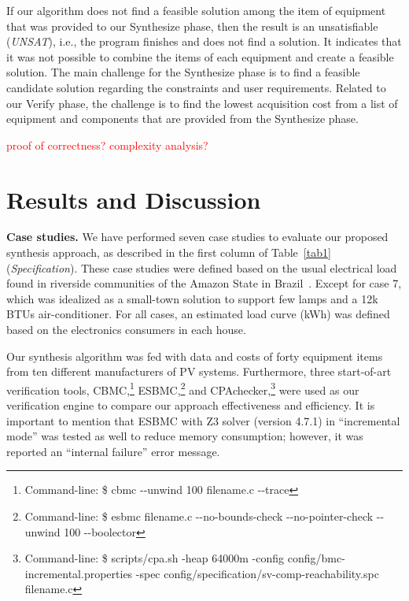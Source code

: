 \documentclass[runningheads]{llncs}
\begin{document}
If our algorithm does not find a feasible solution among the item of equipment that was provided to our {\sc Synthesize} phase, then the result is an unsatisfiable (\textit{UNSAT}), i.e., the program finishes and does not find a solution. It indicates that it was not possible to combine the items of each equipment and create a feasible solution. The main challenge for the {\sc Synthesize} phase is to find a feasible candidate solution regarding the constraints and user requirements. Related to our {\sc Verify} phase, the challenge is to find the lowest acquisition cost from a list of equipment and components that are provided from the {\sc Synthesize} phase. 

\textcolor{red}{proof of correctness? complexity analysis?}

\section{Results and Discussion}

\textbf{Case studies.} We have performed seven case studies to evaluate our proposed synthesis approach, as described in the first column of Table~\ref{tab1} 
(\textit{Specification}). These case studies were defined based on the usual electrical load found in riverside communities of the Amazon State in Brazil~\cite{Agrener2013,TrindadeCordeiro19}. Except for case 7, which was idealized as a small-town solution to support few lamps and a 12k BTUs air-conditioner. For all cases, an estimated load curve (kWh) was defined based on the electronics consumers in each house.

Our synthesis algorithm was fed with data and costs of forty equipment items from ten different manufacturers of PV systems. Furthermore, three start-of-art verification tools, CBMC,\footnote{Command-line: \$ cbmc -\phantom{}-unwind 100 filename.c -\phantom{}-trace} ESBMC,\footnote{Command-line: \$ esbmc filename.c -\phantom{}-no-bounds-check -\phantom{}-no-pointer-check -\phantom{}-unwind 100 -\phantom{}-boolector} and CPAchecker,\footnote{Command-line: \$ scripts/cpa.sh -heap 64000m -config config/bmc-incremental.properties -spec config/specification/sv-comp-reachability.spc filename.c} were used as our verification engine to compare our approach effectiveness and efficiency. It is important to mention that ESBMC with Z3 solver (version 4.7.1) in ``incremental mode'' was tested as well to reduce memory consumption; however, it was reported an ``internal failure'' error message. %
\end{document}
